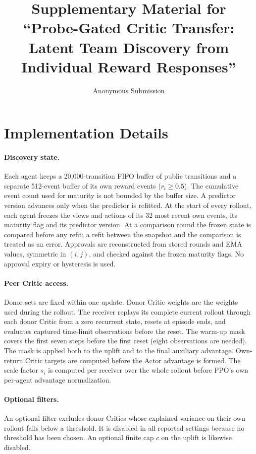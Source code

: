 \documentclass[10pt]{article}
\title{Supplementary Material for\\``Probe-Gated Critic Transfer: Latent Team Discovery from Individual Reward Responses''}
\author{Anonymous Submission}
\date{}
\begin{document}
\maketitle

\section{Implementation Details}
\paragraph{Discovery state.} Each agent keeps a 20{,}000-transition FIFO buffer of public transitions and a separate 512-event buffer of its own reward events ($r_i\ge0.5$). The cumulative event count used for maturity is not bounded by the buffer size. A predictor version advances only when the predictor is refitted. At the start of every rollout, each agent freezes the views and actions of its 32 most recent own events, its maturity flag and its predictor version. At a comparison round the frozen state is compared before any refit; a refit between the snapshot and the comparison is treated as an error. Approvals are reconstructed from stored rounds and EMA values, symmetric in $(i,j)$, and checked against the frozen maturity flags. No approval expiry or hysteresis is used.

\paragraph{Peer Critic access.} Donor sets are fixed within one update. Donor Critic weights are the weights used during the rollout. The receiver replays its complete current rollout through each donor Critic from a zero recurrent state, resets at episode ends, and evaluates captured time-limit observations before the reset. The warm-up mask covers the first seven steps before the first reset (eight observations are needed). The mask is applied both to the uplift and to the final auxiliary advantage. Own-return Critic targets are computed before the Actor advantage is formed. The scale factor $s_i$ is computed per receiver over the whole rollout before PPO's own per-agent advantage normalization.

\paragraph{Optional filters.} An optional filter excludes donor Critics whose explained variance on their own rollout falls below a threshold. It is disabled in all reported settings because no threshold has been chosen. An optional finite cap $c$ on the uplift is likewise disabled.
\end{document}
